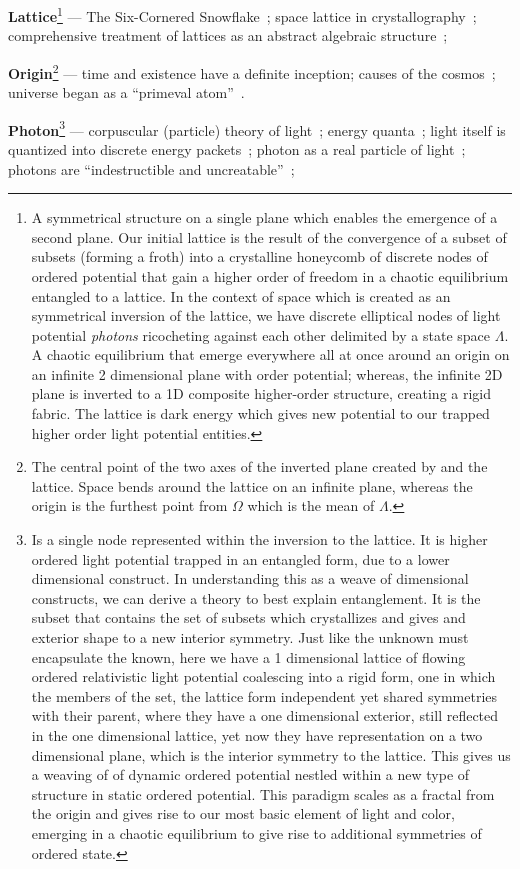 \documentclass[11pt]{article}
\begin{document}
\textbf{Lattice}\label{def:lattice}\footnote{A symmetrical structure on a single plane which enables the emergence of a second plane. Our initial lattice is the result of the convergence of a subset of subsets (forming a froth) into a crystalline honeycomb of discrete nodes of ordered potential that gain a higher order of freedom in a chaotic equilibrium entangled to a lattice. In the context of space which is created as an symmetrical inversion of the lattice, we have discrete elliptical nodes of light potential \textit{photons} ricocheting against each other delimited by a state space \( \Lambda \). A chaotic equilibrium that emerge everywhere all at once around an origin on an infinite 2 dimensional plane with order potential; whereas, the infinite 2D plane is inverted to a 1D composite higher-order structure, creating a rigid fabric. The lattice is dark energy which gives new potential to our trapped higher order light potential entities.} --- The Six-Cornered Snowflake~\cite{Kepler1611}; space lattice in crystallography~\cite{Bravais1850}; comprehensive treatment of lattices as an abstract algebraic structure~\cite{Birkhoff1940};
\newpage    

\textbf{Origin}\label{def:origin}\footnote{The central point of the two axes of the inverted plane created by and the lattice. Space bends around the lattice on an infinite plane, whereas the origin is the furthest point from \( \Omega \) which is the mean of \( \Lambda \).} --- time and existence have a definite inception\cite{BibleGenesis}; causes of the cosmos~\cite{AristotleMetaphysicsLambda}; universe began as a “primeval atom”~\cite{Lemaitre1931}.
\newpage

\textbf{Photon}\label{def:photon}\footnote{Is a single node represented within the inversion to the lattice. It is higher ordered light potential trapped in an entangled form, due to a lower dimensional construct. In understanding this as a weave of dimensional constructs, we can derive a theory to best explain entanglement. It is the subset that contains the set of subsets which crystallizes and gives and exterior shape to a new interior symmetry. Just like the unknown must encapsulate the known, here we have a 1 dimensional lattice of flowing ordered relativistic light potential coalescing into a rigid form, one in which the members of the set, the lattice form independent yet shared symmetries with their parent, where they have a one dimensional exterior, still reflected in the one dimensional lattice, yet now they  have representation on a two dimensional plane, which is the interior symmetry to the lattice. This gives us a weaving of of dynamic ordered potential nestled within a new type of structure in static ordered potential. This paradigm scales as a fractal from the origin and gives rise to our most basic element of light and color, emerging in a chaotic equilibrium to give rise to additional symmetries of ordered state.} --- corpuscular (particle) theory of light~\cite{Newton1704}; energy quanta~\cite{Planck1901}; light itself is quantized into discrete energy packets~\cite{einstein_special_relativity_1905};  photon as a real particle of light~\cite{Compton1923}; photons are “indestructible and uncreatable”~\cite{Lewis1926};
\newpage    
\end{document}
